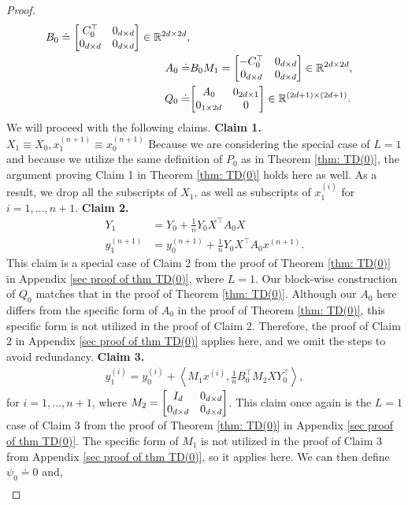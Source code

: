 \documentclass{article}
\newcommand{\R}{\mathbb{R}}
\newcommand{\indot}[2]{{\left<#1, #2\right>}}
\begin{document}
\begin{proof}
\begin{align}
  B_0 \doteq \mqty[C_0^\top & 0_{d\times d} \\ 0_{d \times d} & 0_{d \times d}] \in \R^{2d \times 2d},\\
  A_0 \doteq& B_0M_1  = \mqty[-C_0^\top &  0_{d \times d}\\ 0_{d \times d} & 0_{d \times d}] \in \R^{2d \times 2d},\\
  Q_0 \doteq& \mqty[A_0 & 0_{2d \times 1} \\ 0_{1 \times 2d} & 0] \in \R^{(2d + 1) \times (2d+1)}.
\end{align}
We will proceed with the following claims.
    \textbf{Claim 1. $X_1 \equiv X_0 , x_1^{(n+1)} \equiv x_0^{(n+1)}$}
    Because we are considering the special case of $L=1$ and because we utilize the same definition of $P_0$ as in Theorem \ref{thm: TD(0)}, the argument proving Claim 1 in Theorem \ref{thm: TD(0)} holds here as well. As a result,
    we drop all the subscripts of $X_1$,
    as well as subscripts of $x_1^{(i)}$ for $i=1,\dots, n+1$.
    \textbf{Claim 2.}
    \begin{align}
        Y_{1} &= Y_0 + \frac{1}{n} Y_0 X^\top A_0 X\\
        y_{1}^{(n+1)} &= y_0^{(n+1)} + \frac{1}{n} Y_0 X^\top A_0 x^{(n+1)}.
    \end{align}
This claim is a special case of Claim 2 from the proof of Theorem \ref{thm: TD(0)} in Appendix \ref{sec proof of thm TD(0)}, where $L = 1 $. Our block-wise construction of $Q_0$ matches that in the proof of Theorem \ref{thm: TD(0)}. Although our $A_0$ here differs from the specific form of $A_0$ in the proof of Theorem \ref{thm: TD(0)}, this specific form is not utilized in the proof of Claim 2. Therefore, the proof of Claim 2 in Appendix \ref{sec proof of thm TD(0)} applies here, and we omit the steps to avoid redundancy.
    \textbf{Claim 3.}
    \begin{align}
      y_{1}^{(i)} = y_0^{(i)} + \indot{M_1 x^{(i)}}{ \frac{1}{n} B_0^\top M_2 X Y_0^\top},
    \end{align}
    for $i = 1, \dots, n+1$, where $M_2 = \mqty[I_{d} & 0_{d\times d}\\ 0_{d\times d} & 0_{d\times d}]$.
    This claim once again is the $L=1$ case of Claim 3 from the proof of Theorem \ref{thm: TD(0)} in Appendix \ref{sec proof of thm TD(0)}. The specific form of $M_1$ is not utilized in the proof of Claim 3 from Appendix \ref{sec proof of thm TD(0)}, so it applies here.
    We can then define $\psi_0 \doteq 0$ and,
    \begin{align}

\end{align}
\end{proof}
\end{document}
